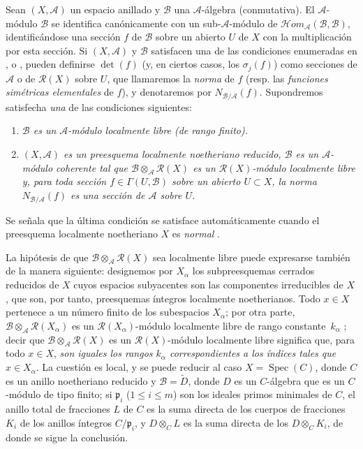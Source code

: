 \documentclass[oneside,10pt]{amsart}
\renewcommand{\leq}{\leqslant}
\newcommand{\oldpage}[2][]{\marginnote{\normalfont\footnotesize\textbf{#1}~|~#2}\ignorespaces}
\let\EGAOriginalLabel\label
\renewcommand{\label}[1]{\phantomsection\EGAOriginalLabel{#1}}
\begin{document}
\begin{env}[6.5.1]
\label{II.6.5.1-fr}
Sean $(X,\mathcal{A})$ un espacio anillado y $\mathcal{B}$ una $\mathcal{A}$-álgebra (conmutativa).
El $\mathcal{A}$-módulo $\mathcal{B}$ se identifica canónicamente con un sub-$\mathcal{A}$-módulo de $\mathcal{H}om_{\mathcal{A}}(\mathcal{B},\mathcal{B})$, identificándose una sección $f$ de $\mathcal{B}$ sobre un abierto $U$ de $X$ con la multiplicación por esta sección.
Si $(X,\mathcal{A})$ y $\mathcal{B}$ satisfacen una de las condiciones enumeradas en ,  o , pueden definirse $\det(f)$ (y, en ciertos casos, los $\sigma_j(f)$) como secciones de $\mathcal{A}$ o de $\mathcal{R}(X)$ sobre $U$, que llamaremos la \emph{norma} de $f$ (resp. las \emph{funciones simétricas elementales} de $f$), y denotaremos por $N_{\mathcal{B}/\mathcal{A}}(f)$.
Supondremos satisfecha \emph{una} de las condiciones siguientes:
\begin{enumerate}
  \item[{\rm(I)}] \emph{$\mathcal{B}$ es un $\mathcal{A}$-módulo localmente libre (de rango finito).}
  \item[{\rm(II)}] \emph{$(X,\mathcal{A})$ es un preesquema localmente noetheriano reducido, $\mathcal{B}$ es un $\mathcal{A}$-módulo coherente tal que $\mathcal{B}\otimes_{\mathcal{A}}\mathcal{R}(X)$ es un $\mathcal{R}(X)$-módulo localmente libre y, para toda sección $f\in\Gamma(U,\mathcal{B})$ sobre un abierto $U\subset X$, la norma $N_{\mathcal{B}/\mathcal{A}}(f)$ es una sección de $\mathcal{A}$ sobre $U$.}
\end{enumerate}

\oldpage[II]{126}
Se señala que la última condición se satisface automáticamente cuando el preesquema localmente noetheriano $X$ es \emph{normal} .

La hipótesis de que $\mathcal{B}\otimes_{\mathcal{A}}\mathcal{R}(X)$ sea localmente libre puede expresarse también de la manera siguiente: designemos por $X_\alpha$ los subpreesquemas cerrados reducidos de $X$ cuyos espacios subyacentes son las componentes irreducibles de $X$ , que son, por tanto, preesquemas íntegros localmente noetherianos.
Todo $x\in X$ pertenece a un número finito de los subespacios $X_\alpha$;
por otra parte, $\mathcal{B}\otimes_{\mathcal{A}}\mathcal{R}(X_\alpha)$ es un $\mathcal{R}(X_\alpha)$-módulo localmente libre de rango constante~$k_\alpha$ ;
decir que $\mathcal{B}\otimes_{\mathcal{A}}\mathcal{R}(X)$ es un $\mathcal{R}(X)$-módulo localmente libre significa que, para todo $x\in X$, \emph{son iguales los rangos $k_\alpha$ correspondientes a los índices tales que $x\in X_\alpha$}.
La cuestión es local, y se puede reducir al caso $X=\operatorname{Spec}(C)$, donde $C$ es un anillo noetheriano reducido y $\mathcal{B}=\widetilde{D}$, donde $D$ es un $C$-álgebra que es un $C$-módulo de tipo finito;
si $\mathfrak{p}_i$ ($1\leq i\leq m$) son los ideales primos minimales de $C$, el anillo total de fracciones $L$ de $C$ es la suma directa de los cuerpos de fracciones $K_i$ de los anillos íntegros $C/\mathfrak{p}_i$, y $D\otimes_C L$ es la suma directa de los $D\otimes_C K_i$, de donde se sigue la conclusión.


\end{env}
\end{document}
